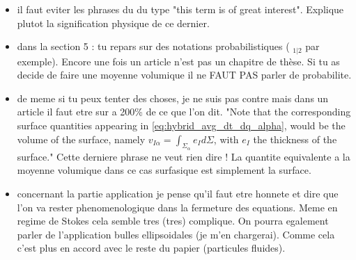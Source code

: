 {\begin{itemize}
\item il faut eviter les phrases du du type "this term is of great interest". Explique plutot la signification physique de ce dernier.
\item dans la section 5 : tu repars sur des notations probabilistiques ( $_{1|2}$ par exemple). Encore une fois un article n'est pas un chapitre de thèse. Si tu as decide de faire une moyenne volumique il ne FAUT PAS parler de probabilite.
\item de meme si tu peux tenter des choses, je ne suis pas contre mais dans un article il faut etre sur a 200\% de ce que l'on dit. "Note that the corresponding surface quantities appearing in \ref{eq:hybrid_avg_dt_dq_alpha}, would be the volume of the surface, namely $v_{I\alpha} = \int_{\Sigma_\alpha} e_I d\Sigma$, with $e_I$ the thickness of the surface." Cette derniere phrase ne veut rien dire ! La quantite equivalente a la moyenne volumique dans ce cas surfasique est simplement la surface.
\item concernant la partie application je pense qu'il faut etre honnete et dire que l'on va rester phenomenologique dans la fermeture des equations. Meme en regime de Stokes cela semble tres (tres) complique. On pourra egalement parler de l'application bulles ellipsoidales (je m'en chargerai). Comme cela c'est plus en accord avec le reste du papier (particules fluides).
\end{itemize}


}
